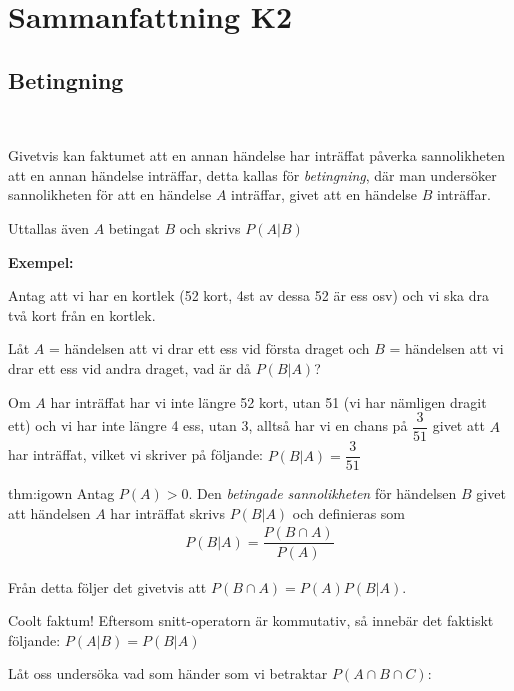 \section{Sammanfattning K2}
\subsection{Betingning}\hfill\\\par
\noindent Givetvis kan faktumet att en annan händelse har inträffat påverka sannolikheten att en annan händelse inträffar, detta kallas för \textit{betingning}, där man undersöker sannolikheten för att en händelse $A$ inträffar, givet att en händelse $B$ inträffar.\par
\noindent Uttallas även $A$ betingat $B$ och skrivs $P(A|B)$
\par\bigskip
\noindent\textbf{Exempel:}\par
\noindent Antag att vi har en kortlek (52 kort, 4st av dessa 52 är ess osv) och vi ska dra två kort från en kortlek. \par
\noindent Låt $A$ = händelsen att vi drar ett ess vid första draget och $B$ = händelsen att vi drar ett ess vid andra draget, vad är då $P(B|A)$?
\par\bigskip
\noindent Om $A$ har inträffat har vi inte längre 52 kort, utan 51 (vi har nämligen dragit ett) och vi har inte längre 4 ess, utan 3, alltså har vi en chans på $\dfrac{3}{51}$ givet att $A$ har inträffat, vilket vi skriver på följande: $P(B|A) = \dfrac{3}{51}$
\par\bigskip
\begin{theo}{thm:igown}
  Antag $P(A)>0$. Den \textit{betingade sannolikheten} för händelsen $B$ givet att händelsen $A$ har inträffat skrivs $P(B|A)$ och definieras som
  \begin{equation*}
    \begin{gathered}
      P(B|A) = \dfrac{P(B\cap A)}{P(A)}
    \end{gathered}
  \end{equation*}
\end{theo}
\par\bigskip
\noindent Från detta följer det givetvis att $P(B\cap A) = P(A)P(B|A)$.\par
\noindent Coolt faktum! Eftersom snitt-operatorn är kommutativ, så innebär det faktiskt följande: $P(A|B) = P(B|A)$
\par\bigskip
\noindent Låt oss undersöka vad som händer som vi betraktar $P(A\cap B\cap C)$:
